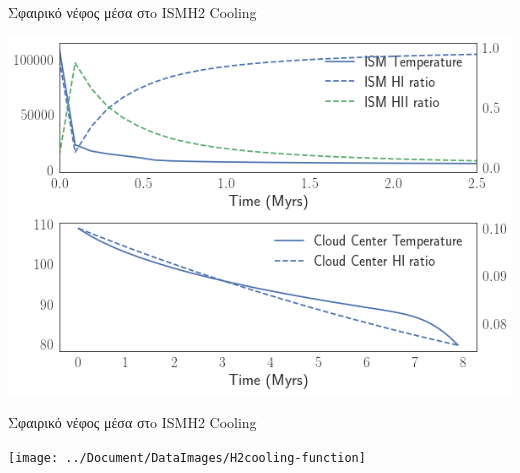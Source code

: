 \documentclass{beamer}
\begin{document}
\begin{frame}{Σφαιρικό νέφος μέσα στo ISM}{Η2 Cooling}
\begin{center}
	\includegraphics[width=0.8\linewidth]{../Document/DataImages/H2CoolingTMPcenterISM}
\end{center}
\end{frame}

\begin{frame}{Σφαιρικό νέφος μέσα στo ISM}{Η2 Cooling}
\begin{center}
	\texttt{[image: ../Document/DataImages/Η2cooling-function]}
\end{center}
\end{frame}



\end{document}
